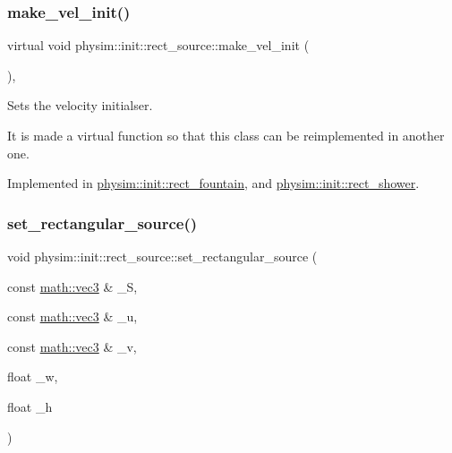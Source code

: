 \subsubsection{\texorpdfstring{make\+\_\+vel\+\_\+init()}{make\_vel\_init()}}
{\footnotesize\ttfamily virtual void physim\+::init\+::rect\+\_\+source\+::make\+\_\+vel\+\_\+init (\begin{DoxyParamCaption}{ }\end{DoxyParamCaption})\hspace{0.3cm}{\ttfamily [protected]}, {}}



Sets the velocity initialser. 

It is made a virtual function so that this class can be reimplemented in another one. 

Implemented in \hyperlink{classphysim_1_1init_1_1rect__fountain_a3070a3ff21834d8a9a8315dac3e6fffe}{physim\+::init\+::rect\+\_\+fountain}, and \hyperlink{classphysim_1_1init_1_1rect__shower_adb3c74e88c13b26955e4c817e7ffe343}{physim\+::init\+::rect\+\_\+shower}.

\mbox{\label{classphysim_1_1init_1_1rect__source_a6f398085d0f0391b2acf91cebd5b97c1}} 
\subsubsection{\texorpdfstring{set\+\_\+rectangular\+\_\+source()}{set\_rectangular\_source()}}
{\footnotesize\ttfamily void physim\+::init\+::rect\+\_\+source\+::set\+\_\+rectangular\+\_\+source (\begin{DoxyParamCaption}\item[{const \hyperlink{structphysim_1_1math_1_1vec3}{math\+::vec3} \&}]{\+\_\+S,  }\item[{const \hyperlink{structphysim_1_1math_1_1vec3}{math\+::vec3} \&}]{\+\_\+u,  }\item[{const \hyperlink{structphysim_1_1math_1_1vec3}{math\+::vec3} \&}]{\+\_\+v,  }\item[{float}]{\+\_\+w,  }\item[{float}]{\+\_\+h }\end{DoxyParamCaption})}



